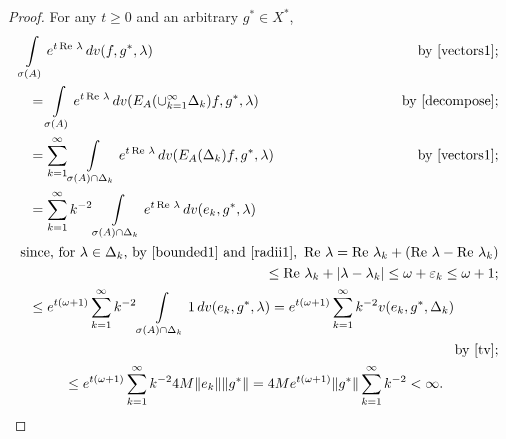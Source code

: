 \documentclass{amsart}
\theoremstyle{plain}
\theoremstyle{definition}
\begin{document}
\begin{proof}
For any $t\ge 0$ and an arbitrary $g^*\in X^*$,
\begin{multline}\label{first1}
\int\limits_{\sigma(A)}e^{t\operatorname{Re\,}\lambda}\,dv(f,g^*,\lambda)
\hfill \text{by \eqref{vectors1};}
\\
\shoveleft{
=\int\limits_{\sigma(A)} e^{t\operatorname{Re\,}\lambda}\,d v(E_A(\cup_{k=1}^\infty \Delta_k)f,g^*,\lambda)
\hfill
\text{by \eqref{decompose};}
}\\
\shoveleft{
=\sum_{k=1}^\infty\int\limits_{\sigma(A)\cap\Delta_k}e^{t\operatorname{Re\,}\lambda}\,dv(E_A(\Delta_k)f,g^*,\lambda)
\hfill 
\text{by \eqref{vectors1};}
}\\
\shoveleft{
=\sum_{k=1}^\infty k^{-2}\int\limits_{\sigma(A)\cap\Delta_k}e^{t\operatorname{Re\,}\lambda}\,dv(e_k,g^*,\lambda)
}\\
\hfill
\text{since, for $\lambda\in \Delta_k$, by \eqref{bounded1} and \eqref{radii1},}\ 
\operatorname{Re\,}\lambda=\operatorname{Re\,}\lambda_k+(\operatorname{Re\,}\lambda-\operatorname{Re\,}\lambda_k)
\\
\hfill
\le \operatorname{Re\,}\lambda_k+|\lambda-\lambda_k|\le \omega+\varepsilon_k\le \omega+1;
\\
\shoveleft{
\le e^{t(\omega+1)}\sum_{k=1}^\infty k^{-2}\int\limits_{\sigma(A)\cap\Delta_k}1\,dv(e_k,g^*,\lambda)
= e^{t(\omega+1)}\sum_{k=1}^\infty k^{-2}v(e_k,g^*,\Delta_k)
}\\
\hfill
\text{by \eqref{tv};}
\\
\hspace{1.2cm}
\le e^{t(\omega+1)}\sum_{k=1}^\infty k^{-2}4M\|e_k\|\|g^*\|
= 4Me^{t(\omega+1)}\|g^*\|\sum_{k=1}^\infty k^{-2}<\infty.
\hfill
\end{multline} 


\end{proof}
\end{document}
